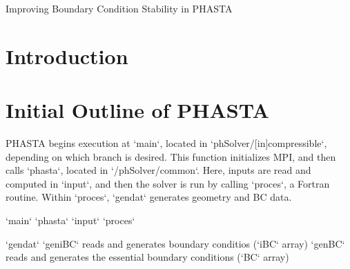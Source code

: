 \documentclass[11pt]{article}
\begin{document}
{
	\fancyhf[LH]{\rightmark}
	\fancyhf[CH]{}
	\fancyhf[RH]{\thepage\hspace*{1ex}/\hspace*{1ex}\pageref{lastpage}}
	\fancyhf[LF]{}
	\fancyhf[CF]{}
	\fancyhf[RF]{}
}

{
	\fancyhf[CH]{}
	\fancyhf[LF]{}
	\fancyhf[CF]{}
	\fancyhf[RF]{}
}

\pagestyle{allpages}
\thispagestyle{firstpage}
\renewcommand{\sectionmark}[1]{ \markright{#1}{} }


\vspace*{0in}
\begin{center}
\LARGE Improving Boundary Condition Stability in PHASTA
\end{center}
\vspace*{0.3in}

\section{Introduction} %

\section{Initial Outline of PHASTA} %

PHASTA begins execution at `main`, located in `phSolver/[in]compressible`, depending on which branch is desired. This function initializes MPI, and then calls `phasta`, located in `/phSolver/common`. Here, inputs are read and computed in `input`, and then the solver is run by calling `proces`, a Fortran routine. Within `proces`, `gendat` generates geometry and BC data.
\begin{outline}[deep]
\1 `main`
	\2 `phasta`
		\3 `input`
		\3 `proces`
\end{outline}
		
\begin{outline}[deep]
\1 `gendat`
	\2 `geniBC` reads and generates boundary conditios (`iBC` array)
	\2 `genBC` reads and generates the essential boundary conditions (`BC` array)
\end{outline}

\label{lastpage}
\end{document}
